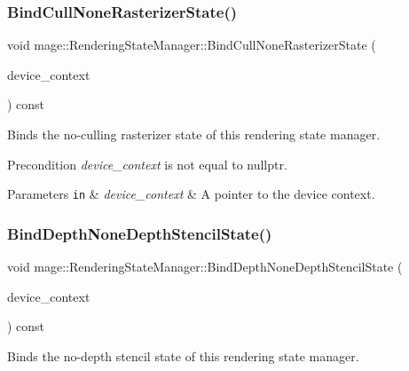 \subsubsection{\texorpdfstring{Bind\+Cull\+None\+Rasterizer\+State()}{BindCullNoneRasterizerState()}}
{\footnotesize\ttfamily void mage\+::\+Rendering\+State\+Manager\+::\+Bind\+Cull\+None\+Rasterizer\+State (\begin{DoxyParamCaption}\item[{I\+D3\+D11\+Device\+Context4 $\ast$}]{device\+\_\+context }\end{DoxyParamCaption}) const\hspace{0.3cm}{\ttfamily [noexcept]}}

Binds the no-\/culling rasterizer state of this rendering state manager.

\begin{DoxyPrecond}{Precondition}
{\itshape device\+\_\+context} is not equal to {\ttfamily nullptr}. 
\end{DoxyPrecond}

\begin{DoxyParams}[1]{Parameters}
\mbox{\tt in}  & {\em device\+\_\+context} & A pointer to the device context. \\
\hline
\end{DoxyParams}
\hypertarget{classmage_1_1_rendering_state_manager_ab3006eac54bc9027975529484e897d33}{}\label{classmage_1_1_rendering_state_manager_ab3006eac54bc9027975529484e897d33} 
\subsubsection{\texorpdfstring{Bind\+Depth\+None\+Depth\+Stencil\+State()}{BindDepthNoneDepthStencilState()}}
{\footnotesize\ttfamily void mage\+::\+Rendering\+State\+Manager\+::\+Bind\+Depth\+None\+Depth\+Stencil\+State (\begin{DoxyParamCaption}\item[{I\+D3\+D11\+Device\+Context4 $\ast$}]{device\+\_\+context }\end{DoxyParamCaption}) const\hspace{0.3cm}{\ttfamily [noexcept]}}

Binds the no-\/depth stencil state of this rendering state manager.

